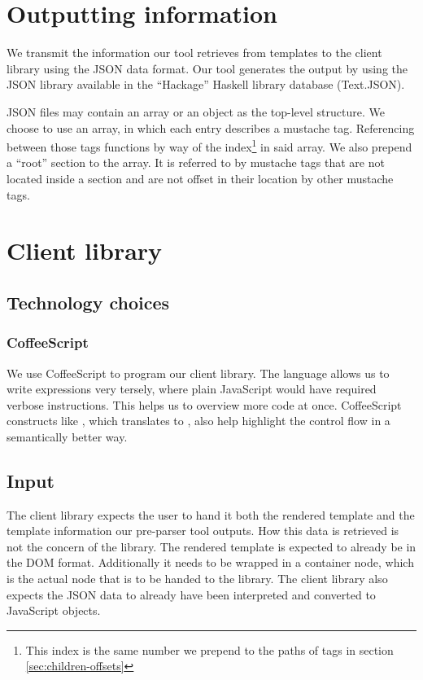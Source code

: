 \documentclass[thesis.tex]{subfiles}
\begin{document}
\section{Outputting information}
\label{sec:output}
We transmit the information our tool retrieves from templates to the client
library using the JSON data format. Our tool generates the output by using the
JSON library available in the ``Hackage'' Haskell library database (Text.JSON).

JSON files may contain an array or an object as the top-level structure.
We choose to use an array, in which each entry describes a mustache tag.
Referencing between those tags functions by way of the index\footnote{
	This index is the same number we prepend to the paths of tags in section
	\ref{sec:children-offsets}
} in said array.
We also prepend a ``root'' section to the array. It is referred to by mustache
tags that are not located inside a section and are not offset in their location
by other mustache tags.



\section{Client library}

\subsection{Technology choices}

\subsubsection{CoffeeScript}
We use CoffeeScript to program our client library. The language allows us to 
write expressions very tersely, where plain JavaScript would have required
verbose instructions. This helps us to overview more code at once.
CoffeeScript constructs like , which translates to
, also help highlight the control flow in a semantically
better way.

\subsection{Input}
The client library expects the user to hand it both the rendered template and
the template information our pre-parser tool outputs.
How this data is retrieved is not the concern of the library.
The rendered template is expected to already be in the DOM format.
Additionally it needs to be wrapped in a container node,
which is the actual node that is to be handed to the library.
The client library also expects the JSON data to already have been interpreted
and converted to JavaScript objects.
\end{document}
